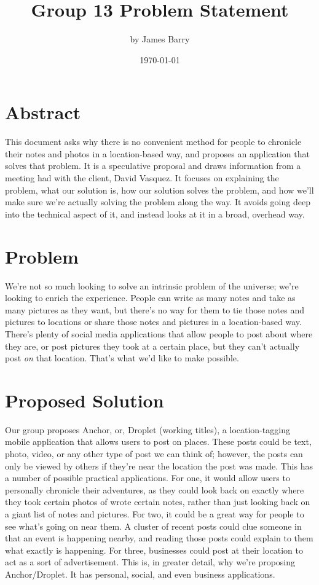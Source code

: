 \documentclass[draftclsnofoot,onecolumn,journal,letterpaper,10pt]{IEEEtran}
\title{Group 13 Problem Statement}
\author{by James Barry}
\date{\today}
\begin{document}
\maketitle

\section{Abstract}

This document asks why there is no convenient method for people to chronicle their notes and photos in a location-based way, and proposes an application that solves that problem. It is a speculative proposal and draws information from a meeting had with the client, David Vasquez. It focuses on explaining the problem, what our solution is, how our solution solves the problem, and how we'll make sure we're actually solving the problem along the way. It avoids going deep into the technical aspect of it, and instead looks at it in a broad, overhead way.

\pagebreak

\section{Problem}

We're not so much looking to solve an intrinsic problem of the universe; we're looking to enrich the experience. People can write as many notes and take as many pictures as they want, but there's no way for them to tie those notes and pictures to locations or share those notes and pictures in a location-based way. There's plenty of social media applications that allow people to post about where they are, or post pictures they took at a certain place, but they can't actually post \textit{on} that location. That's what we'd like to make possible. 

\section{Proposed Solution}

Our group proposes Anchor, or, Droplet (working titles), a location-tagging mobile application that allows users to post on places. These posts could be text, photo, video, or any other type of post we can think of; however, the posts can only be viewed by others if they're near the location the post was made. This has a number of possible practical applications. For one, it would allow users to personally chronicle their adventures, as they could look back on exactly where they took certain photos of wrote certain notes, rather than just looking back on a giant list of notes and pictures. For two, it could be a great way for people to see what's going on near them. A cluster of recent posts could clue someone in that an event is happening nearby, and reading those posts could explain to them what exactly is happening. For three, businesses could post at their location to act as a sort of advertisement. This is, in greater detail, why we're proposing Anchor/Droplet. It has personal, social, and even business applications. 
\end{document}
